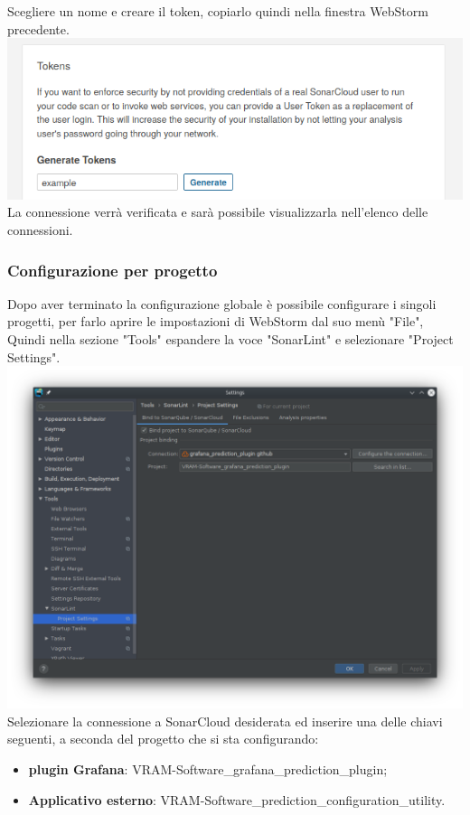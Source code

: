 Scegliere un nome e creare il token, copiarlo quindi nella finestra WebStorm precedente.
\\
\includegraphics[width=\textwidth,height=\textheight,keepaspectratio]{img/sonarcloud.png}
La connessione verrà verificata e sarà possibile visualizzarla nell'elenco delle connessioni.
\subsubsection{Configurazione per progetto}
Dopo aver terminato la configurazione globale è possibile configurare i singoli progetti, per farlo aprire le impostazioni di WebStorm dal suo menù "File", Quindi nella sezione "Tools" espandere la voce "SonarLint" e selezionare "Project Settings".
\\
\includegraphics[width=\textwidth,height=\textheight,keepaspectratio]{img/sonarlint-project.png}
Selezionare la connessione a SonarCloud desiderata ed inserire una delle chiavi seguenti, a seconda del progetto che si sta configurando:
\begin{itemize}
	\item \textbf{plugin Grafana}: VRAM-Software\_grafana\_prediction\_plugin;
	\item \textbf{Applicativo esterno}: VRAM-Software\_prediction\_configuration\_utility.
\end{itemize}

